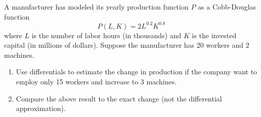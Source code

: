 \documentclass[12pt]{amsart}
\begin{document}
\newpage

\begin{problem}[20 points]
A manufacturer has modeled its yearly production function $P$  as a Cobb-Douglas function
$$
	P(L, K)= 2 L^{0.2} K^{0.8}
$$
where $L$ is the number of labor hours (in thousands) and $K$ is the invested capital (in millions of dollars).
Suppose the manufacturer has 20 workers and 2 machines.
\begin{enumerate}
	\item Use differentials to estimate the change in production if the company want to employ only 15 workers and increase to 3 machines.
	      \vspace{6cm}
	\item Compare the above result to the exact change (not the differential approximation).
	      \vspace{6cm}
\end{enumerate}
\end{problem}

\printbibliography
%
%
\end{document}
